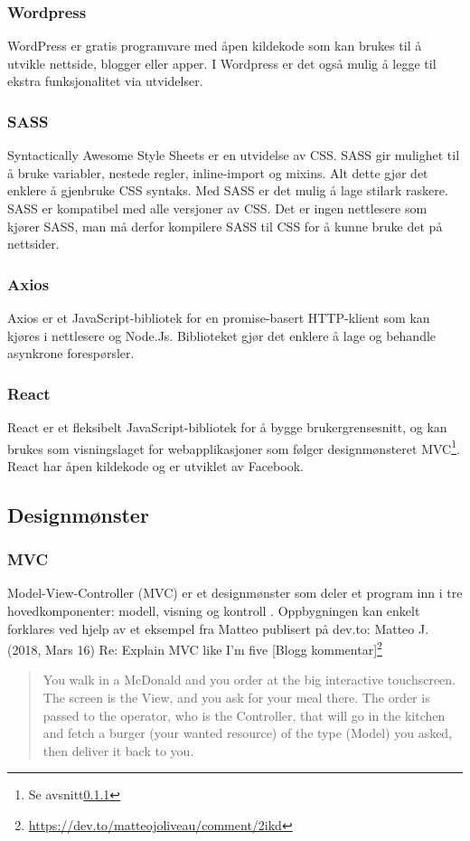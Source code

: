 \subsubsection{Wordpress}
WordPress\cite{wordpress} er gratis programvare med åpen kildekode som kan brukes til å utvikle nettside, blogger eller apper. I Wordpress er det også mulig å legge til ekstra funksjonalitet via utvidelser.

\subsubsection{SASS}
Syntactically Awesome Style Sheets \cite{Catlin2006cws} er en utvidelse av CSS. SASS gir mulighet til å bruke variabler, nestede regler, inline-import og mixins. Alt dette gjør det enklere å gjenbruke CSS syntaks. Med SASS er det mulig å lage stilark raskere. SASS er kompatibel med alle versjoner av CSS. Det er ingen nettlesere som kjører SASS, man må derfor kompilere SASS til CSS for å kunne bruke det på nettsider.

\subsubsection{Axios}
\label{sec:tool:axios}
Axios\cite{axios2019a} er et JavaScript-bibliotek for en promise-basert HTTP-klient som kan kjøres i nettlesere og Node.Js. Biblioteket gjør det enklere å lage og behandle asynkrone forespørsler.


\subsubsection{React}
React\cite{facebook2019r} er et fleksibelt JavaScript-bibliotek for å bygge brukergrensesnitt, og kan brukes som visningslaget for webapplikasjoner som følger designmønsteret MVC\footnote{Se avsnitt\ref{sec:tools-mvc}}. React har åpen kildekode og er utviklet av Facebook.

\subsection{Designmønster}

\subsubsection{MVC}
\label{sec:tools-mvc}
Model-View-Controller (MVC)\cite{burbeck87aps} er et designmønster som deler et program inn i tre hovedkomponenter: modell, visning og kontroll \cite{burbeck87aps}. Oppbygningen kan enkelt forklares ved hjelp av et eksempel fra Matteo publisert på dev.to:
Matteo J. (2018, Mars 16) Re: Explain MVC like I'm five [Blogg kommentar]\footnote{\url{https://dev.to/matteojoliveau/comment/2ikd}}
\begin{quote}
    You walk in a McDonald and you order at the big interactive touchscreen.
    The screen is the View, and you ask for your meal there.
    The order is passed to the operator, who is the Controller, that will go in the kitchen and fetch a burger (your wanted resource) of the type (Model) you asked, then deliver it back to you.
\end{quote}

